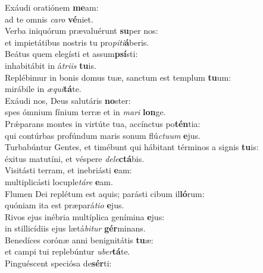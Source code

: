 \evenverse Exáudi oratiónem \textbf{me}am:~\*\\
\evenverse ad te omnis \textit{ca}\textit{ro} \textbf{vé}niet.\\
\oddverse Verba iniquórum prævaluérunt \textbf{su}per nos:~\*\\
\oddverse et impietátibus nostris tu pro\textit{pi}\textit{ti}\textbf{á}beris.\\
\evenverse Beátus quem elegísti et assum\textbf{psí}sti:~\*\\
\evenverse inhabitábit in á\textit{tri}\textit{is} \textbf{tu}is.\\
\oddverse Replébimur in bonis domus tuæ, sanctum est templum \textbf{tu}um:~\*\\
\oddverse mirábile in \textit{æ}\textit{qui}\textbf{tá}te.\\
\evenverse Exáudi nos, Deus salutáris \textbf{no}ster:~\*\\
\evenverse spes ómnium fínium terræ et in \textit{ma}\textit{ri} \textbf{lon}ge.\\
\oddverse Prǽparans montes in virtúte tua, accínctus po\textbf{tén}tia:~\*\\
\oddverse qui contúrbas profúndum maris sonum flú\textit{ctu}\textit{um} \textbf{e}jus.\\
\evenverse Turbabúntur Gentes, et timébunt qui hábitant términos a signis \textbf{tu}is:~\*\\
\evenverse éxitus matutíni, et véspere \textit{de}\textit{le}\textbf{ctá}bis.\\
\oddverse Visitásti terram, et inebriásti \textbf{e}am:~\*\\
\oddverse multiplicásti locuple\textit{tá}\textit{re} \textbf{e}am.\\
\evenverse Flumen Dei replétum est aquis; parásti cibum il\textbf{ló}rum:~\*\\
\evenverse quóniam ita est præpará\textit{ti}\textit{o} \textbf{e}jus.\\
\oddverse Rivos ejus inébria multíplica genímina \textbf{e}jus:~\*\\
\oddverse in stillicídiis ejus lætá\textit{bi}\textit{tur} \textbf{gér}minans.\\
\evenverse Benedíces corónæ anni benignitátis \textbf{tu}æ:~\*\\
\evenverse et campi tui replebúntur \textit{u}\textit{ber}\textbf{tá}te.\\
\oddverse Pinguéscent speciósa de\textbf{sér}ti:~\*\\
